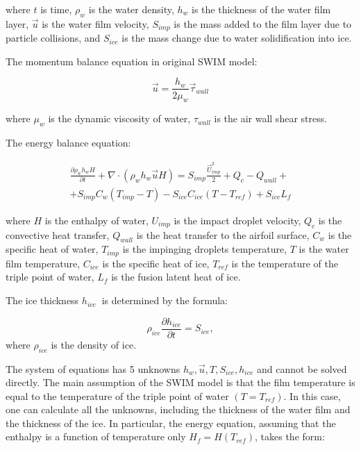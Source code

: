 \documentclass[aerospace,article,submit,moreauthors,pdftex]{Definitions/mdpi}
\begin{document}
where $t$ is time, $\rho_{w}$ is the water density, $h_{w}$ is the thickness of the water film layer, $\vec u$ is the water film velocity, $S_{imp}$ is the mass added to the film layer due to particle collisions, and $S_{ice}$ is the mass change due to water solidification into ice.

The momentum balance equation in original SWIM model:

\begin{equation}
     \vec u = \frac{h_{w}}{2\mu_{w}} \vec \tau_{wall}  
\end{equation}

where $\mu_{w}$ is the dynamic viscosity of water, $\tau_{wall}$ is the air wall shear stress.

The energy balance equation:

\begin{multline}
    \frac{\partial\rho_{w}h_{w}H}{\partial t} + \nabla \cdot \left( \rho_{w}h_{w} \vec u H \right) = S_{imp}\frac{ \vec U_{imp}^{2}}{2} + Q_{c} - Q_{wall}+\\+ S_{imp}C_{w}\left( T_{imp} - T \right) - S_{ice}C_{ice}\left( T - T_{ref} \right) + S_{ice}L_{f} %
\end{multline}

where $H$ is the enthalpy of water, $U_{imp}$ is the impact droplet velocity,  $Q_{c}$ is the convective heat transfer, $Q_{wall}$ is the heat transfer to the airfoil surface, $C_{w}$ is the specific heat of water, $T_{imp}$ is the impinging droplets temperature, $T$ is the water film temperature, $C_{ice}$ is the specific heat of ice, $T_{ref}$ is the temperature of the triple point of water, $L_{f}$ is the fusion latent heat of ice.

The ice thickness $h_{ice}\ $ is determined by the formula:

\begin{equation}
    \rho_{ice}\frac{\partial h_{ice}}{\partial t} = S_{ice},    
\end{equation}
where $\rho_{ice}$ is the density of ice.

The system of equations has 5 unknowns $h_{w}, \vec u, T, S_{ice}, h_{ice}$ and cannot be solved directly. The main assumption of the SWIM model is that the film temperature is equal to the temperature of the triple point of water $(T = T_{ref})$. In this case, one can calculate all the unknowns, including the thickness of the water film and the thickness of the ice. In particular, the energy equation, assuming that the enthalpy is a function of temperature only $H_{f} = H\left( T_{ref} \right)$, takes the form:
\end{document}
